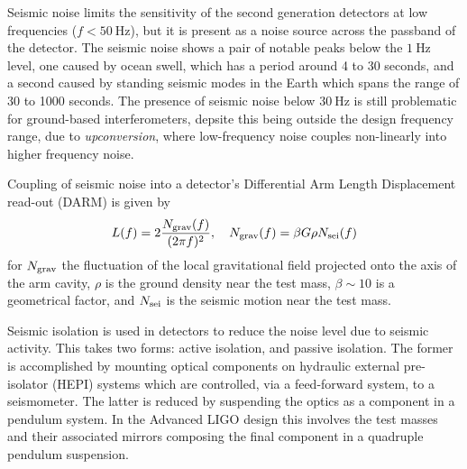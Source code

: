 Seismic noise limits the sensitivity of the second generation
detectors at low frequencies ($f < \SI{50}{\hertz}$), but it is
present as a noise source across the passband of the detector. The
seismic noise shows a pair of notable peaks below the $\SI{1}{\hertz}$
level, one caused by ocean swell, which has a period around 4 to 30
seconds, and a second caused by standing seismic modes in the Earth
which spans the range of 30 to 1000 seconds. The presence of seismic
noise below $\SI{30}{\hertz}$ is still problematic for ground-based
interferometers, depsite this being outside the design frequency
range, due to \emph{upconversion}, where low-frequency noise couples
non-linearly into higher frequency noise.

Coupling of seismic noise into a detector's Differential Arm Length
Displacement read-out (DARM) is given by
\begin{equation}
  \label{eq:darm-seismic}
  L(f) = 2 \frac{N_{\rm grav}(f)}{(2 \pi f)^2}, \quad N_{\rm grav}(f) =  \beta G \rho  N_{\rm sei}(f)
  \end{equation}
  for $N_{\rm grav}$ the fluctuation of the local gravitational field
  projected onto the axis of the arm cavity, $\rho$ is the ground
  density near the test mass, $\beta \sim 10$ is a geometrical factor,
  and $N_{\rm sei}$ is the seismic motion near the test
  mass\cite{2016PhRvD..93k2004M}.

Seismic isolation is used in detectors to reduce the noise level due
to seismic activity. This takes two forms: active isolation, and
passive isolation. The former is accomplished by mounting optical
components on hydraulic external pre-isolator (HEPI) systems which are
controlled, via a feed-forward system, to a seismometer. The latter is
reduced by suspending the optics as a component in a pendulum
system. In the Advanced LIGO design this involves the test masses and
their associated mirrors composing the final component in a quadruple
pendulum suspension.


